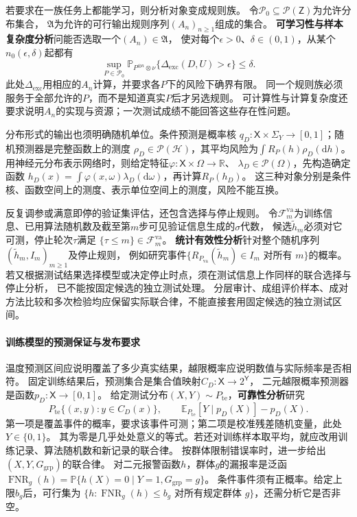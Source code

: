 若要求在一族任务上都能学习，则分析对象变成规则族。
令$\mathcal P_0\subseteq\mathcal P(\mathsf Z)$为允许分布集合，
$\mathfrak A$为允许的可行输出规则序列$(A_n)_{n\geq1}$组成的集合。
\textbf{可学习性与样本复杂度分析}问能否选取一个$(A_n)\in\mathfrak A$，
使对每个$\epsilon>0$、$\delta\in(0,1)$，从某个$n_0(\epsilon,\delta)$起都有
\[
  \sup_{P\in\mathcal P_0}
  \mathbb P_{P^{\otimes n}\otimes\nu}
       \{\Delta_{\mathrm{exc}}(D,U)>\epsilon\}\leq\delta.
\]
此处$\Delta_{\mathrm{exc}}$用相应的$A_n$计算，并要求各$P$下的风险下确界有限。
同一个规则族必须服务于全部允许的$P$，而不是知道真实$P$后才另选规则。
可计算性与计算复杂度还要求说明$A_n$的实现与资源；一次测试成绩不能回答这些存在性问题。

分布形式的输出也须明确随机单位。条件预测是概率核
$q_D:\mathsf X\times\Sigma_Y\to[0,1]$；随机预测器是完整函数上的测度
$\rho_D\in\mathcal P(\mathcal H)$，其平均风险为$\int R_P(h)\rho_D(\mathrm dh)$。
用神经元分布表示网络时，则给定特征$\varphi:\mathsf X\times\Omega\to\mathbb R$、
$\lambda_D\in\mathcal P(\Omega)$，先构造确定函数
$h_D(x)=\int\varphi(x,\omega)\lambda_D(\mathrm d\omega)$，再计算$R_P(h_D)$。
这三种对象分别是条件核、函数空间上的测度、表示单位空间上的测度，风险不能互换。

反复调参或满意即停的验证集评估，还包含选择与停止规则。
令$\mathcal F_m^{\mathrm{va}}$为训练信息、已用算法随机数及截至第$m$步可见验证信息生成的$\sigma$代数，
候选$\widetilde h_m$必须对它可测，停止轮次$\tau$满足
$\{\tau\leq m\}\in\mathcal F_m^{\mathrm{va}}$。
\textbf{统计有效性分析}针对整个随机序列$(\widetilde h_m,I_m)_{m\geq1}$及停止规则，
例如研究事件$\{R_{P_{\mathrm{va}}}(\widetilde h_m)\in I_m\text{ 对所有 }m\}$的概率。
若又根据测试结果选择模型或决定停止时点，须在测试信息上作同样的联合选择与停止分析，
已不能按固定候选的独立测试处理。
分层审计、成组评价样本、成对方法比较和多次检验均应保留实际联合律，不能直接套用固定候选的独立测试区间。

\paragraph{训练模型的预测保证与发布要求}
\label{sec:future-ml-deployment-requirements}

温度预测区间应说明覆盖了多少真实结果，越限概率应说明数值与实际频率是否相符。
固定训练结果后，预测集合是集合值映射$C_D:\mathsf X\to2^{\mathsf Y}$，
二元越限概率预测器是函数$p_D:\mathsf X\to[0,1]$。
给定测试分布$(X,Y)\sim P_{\mathrm{te}}$，\textbf{可靠性分析}研究
\[
  P_{\mathrm{te}}\{(x,y):y\in C_D(x)\},\qquad
  \mathbb E_{P_{\mathrm{te}}}[Y\mid p_D(X)]-p_D(X).
\]
第一项是覆盖事件的概率，要求该事件可测；第二项是校准残差随机变量，此处$Y\in\{0,1\}$。
其为零是几乎处处意义的等式。若还对训练样本取平均，就应改用训练记录、算法随机数和新记录的联合律。
按群体限制错误率时，进一步给出$(X,Y,G_{\mathrm{grp}})$的联合律。
对二元报警函数$h$，群体$g$的漏报率是泛函
$\operatorname{FNR}_g(h)=\mathbb P\{h(X)=0\mid Y=1,G_{\mathrm{grp}}=g\}$。
条件事件须有正概率。给定上限$b_g$后，可行集为
$\{h:\operatorname{FNR}_g(h)\leq b_g\text{ 对所有规定群体 }g\}$，还需分析它是否非空。

